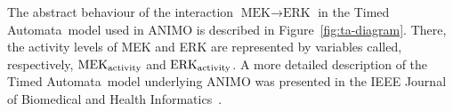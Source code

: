 \documentclass{bmcart}
\def\tas{Timed Automata}
\begin{document}
The abstract behaviour of the interaction $\mbox{MEK} \rightarrow \mbox{ERK}$ in the \tas\ model used in ANIMO is described in Figure~\ref{fig:ta-diagram}.
There, the activity levels of MEK and ERK are represented by variables called, respectively, $\mbox{MEK}_{\mbox{\scriptsize activity}}$
and $\mbox{ERK}_{\mbox{\scriptsize activity}}$. A more detailed description of the \tas\ model underlying ANIMO was
presented in the IEEE Journal of Biomedical and Health Informatics~\cite{animo-ieee}.

\newsavebox{\mysquareLow}
\savebox{\mysquareLow}{%
  \raisebox{-0.08em}{%
    \textcolor{black}{%
      \rule{.7em}{.7em}%
    }%
    \hspace{-.65em}%
    \raisebox{.05em}{%
      \textcolor{lowActivity}{%
	\rule{.6em}{.6em}%
      }%
    }%
  }%
}
\newsavebox{\mysquareHigh}
\savebox{\mysquareHigh}{%
  \raisebox{-0.08em}{%
    \textcolor{black}{%
      \rule{.7em}{.7em}%
    }%
    \hspace{-.65em}%
    \raisebox{.05em}{%
      \textcolor{highActivity}{%
	\rule{.6em}{.6em}%
      }%
    }%
  }%
}
\end{document}
